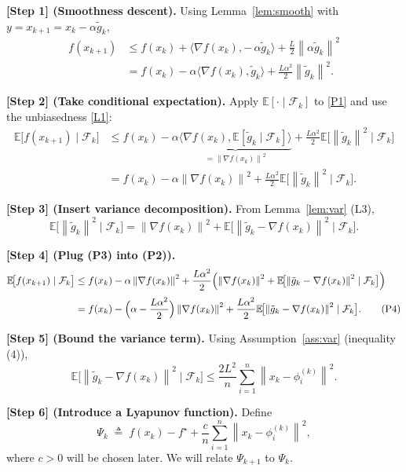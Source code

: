 \documentclass{article}
\newcommand{\E}{\mathbb{E}}
\newcommand{\norm}[1]{\left\|#1\right\|}
\newcommand{\grad}{\nabla}
\begin{document}
\noindent\textbf{[Step 1] (Smoothness descent).}  
Using Lemma~\ref{lem:smooth} with $y=x_{k+1}=x_k-\alpha\tilde g_k$,
\[
\begin{aligned}
f(x_{k+1})
&\le f(x_k)+\langle\grad f(x_k),-\,\alpha\tilde g_k\rangle
      +\frac{L}{2}\norm{\alpha\tilde g_k}^{2}\\[2mm]
&= f(x_k)-\alpha\langle\grad f(x_k),\tilde g_k\rangle
      +\frac{L\alpha^{2}}{2}\norm{\tilde g_k}^{2}.
\tag{P1}
\end{aligned}
\]

\noindent\textbf{[Step 2] (Take conditional expectation).}  
Apply $\E[\cdot\mid\mathcal{F}_k]$ to \eqref{P1} and use the unbiasedness \eqref{L1}:
\[
\begin{aligned}
\E\!\bigl[f(x_{k+1})\mid\mathcal{F}_k\bigr]
&\le f(x_k)-\alpha\underbrace{\langle\grad f(x_k),\E[\tilde g_k\mid\mathcal{F}_k]\rangle}_{=\norm{\grad f(x_k)}^{2}}
   +\frac{L\alpha^{2}}{2}\E\!\bigl[\norm{\tilde g_k}^{2}\mid\mathcal{F}_k\bigr]\\[1mm]
&= f(x_k)-\alpha\norm{\grad f(x_k)}^{2}
   +\frac{L\alpha^{2}}{2}\E\!\bigl[\norm{\tilde g_k}^{2}\mid\mathcal{F}_k\bigr].
\tag{P2}
\end{aligned}
\]

\noindent\textbf{[Step 3] (Insert variance decomposition).}  
From Lemma~\ref{lem:var} (L3),
\[
\E\!\bigl[\norm{\tilde g_k}^{2}\mid\mathcal{F}_k\bigr]
= \norm{\grad f(x_k)}^{2}
  +\E\!\bigl[\norm{\tilde g_k-\grad f(x_k)}^{2}\mid\mathcal{F}_k\bigr].
\tag{P3}
\]

\noindent\textbf{[Step 4] (Plug (P3) into (P2)).}
\[
\begin{aligned}
\E\!\bigl[f(x_{k+1})\mid\mathcal{F}_k\bigr]
&\le f(x_k)-\alpha\norm{\grad f(x_k)}^{2}
   +\frac{L\alpha^{2}}{2}\Bigl(\norm{\grad f(x_k)}^{2}
   +\E\!\bigl[\norm{\tilde g_k-\grad f(x_k)}^{2}\mid\mathcal{F}_k\bigr]\Bigr)\\[1mm]
&= f(x_k)-\Bigl(\alpha-\frac{L\alpha^{2}}{2}\Bigr)\norm{\grad f(x_k)}^{2}
   +\frac{L\alpha^{2}}{2}\E\!\bigl[\norm{\tilde g_k-\grad f(x_k)}^{2}\mid\mathcal{F}_k\bigr].
\tag{P4}
\end{aligned}
\]

\noindent\textbf{[Step 5] (Bound the variance term).}  
Using Assumption~\ref{ass:var} (inequality (4)),
\[
\E\!\bigl[\norm{\tilde g_k-\grad f(x_k)}^{2}\mid\mathcal{F}_k\bigr]
\le \frac{2L^{2}}{n}\sum_{i=1}^{n}\norm{x_k-\phi_i^{(k)}}^{2}.
\tag{P5}
\]

\noindent\textbf{[Step 6] (Introduce a Lyapunov function).}  
Define
\[
\Psi_k \;\triangleq\; f(x_k)-f^{\star}
      +\frac{c}{n}\sum_{i=1}^{n}\norm{x_k-\phi_i^{(k)}}^{2},
\tag{P6}
\]
where $c>0$ will be chosen later.  
We will relate $\Psi_{k+1}$ to $\Psi_{k}$.
\end{document}
